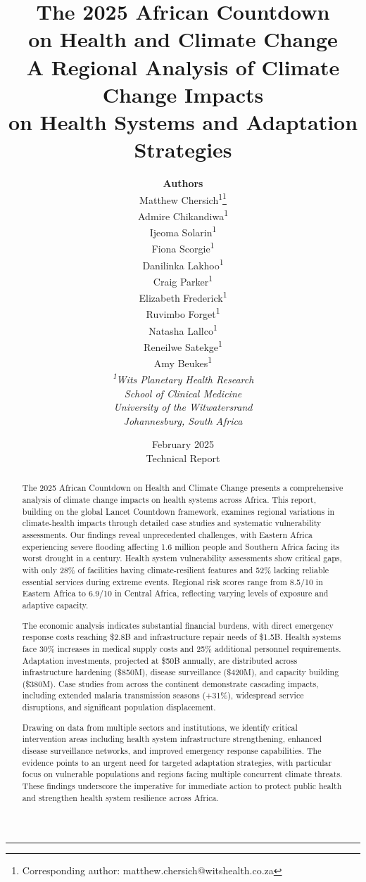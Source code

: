 \documentclass[12pt,a4paper]{article}
\title{The 2025 African Countdown\\[0.3em]
on Health and Climate Change\\[1cm]
{\color{subtitlegray}\Large A Regional Analysis of Climate Change Impacts\\
on Health Systems and Adaptation Strategies}}
\author{%
    \textbf{Authors}\\[0.5cm]
    Matthew Chersich\textsuperscript{1}\thanks{Corresponding author: matthew.chersich@witshealth.co.za}\\
    Admire Chikandiwa\textsuperscript{1} \\
    Ijeoma Solarin\textsuperscript{1} \\
    Fiona Scorgie\textsuperscript{1} \\
    Danilinka Lakhoo\textsuperscript{1} \\
    Craig Parker\textsuperscript{1} \\
    Elizabeth Frederick\textsuperscript{1} \\
    Ruvimbo Forget\textsuperscript{1} \\
    Natasha Lallco\textsuperscript{1} \\
    Reneilwe Satekge\textsuperscript{1} \\
    Amy Beukes\textsuperscript{1}%
    \\[1.5cm]
    {\small\itshape
    \textsuperscript{1}Wits Planetary Health Research\\
    School of Clinical Medicine\\
    University of the Witwatersrand\\
    Johannesburg, South Africa}%
}
\date{{\small February 2025}\\[0.5cm]
{\footnotesize Technical Report}}
\begin{document}
\thispagestyle{empty}
\maketitle

\vspace{-1cm}
\begin{center}
\rule{0.5\textwidth}{0.5pt}
\end{center}

\clearpage

\begin{abstract}
The 2025 African Countdown on Health and Climate Change presents a comprehensive analysis of climate change impacts on health systems across Africa. This report, building on the global Lancet Countdown framework, examines regional variations in climate-health impacts through detailed case studies and systematic vulnerability assessments. Our findings reveal unprecedented challenges, with Eastern Africa experiencing severe flooding affecting 1.6 million people and Southern Africa facing its worst drought in a century. Health system vulnerability assessments show critical gaps, with only 28\% of facilities having climate-resilient features and 52\% lacking reliable essential services during extreme events. Regional risk scores range from 8.5/10 in Eastern Africa to 6.9/10 in Central Africa, reflecting varying levels of exposure and adaptive capacity.

The economic analysis indicates substantial financial burdens, with direct emergency response costs reaching \$2.8B and infrastructure repair needs of \$1.5B. Health systems face 30\% increases in medical supply costs and 25\% additional personnel requirements. Adaptation investments, projected at \$50B annually, are distributed across infrastructure hardening (\$850M), disease surveillance (\$420M), and capacity building (\$380M). Case studies from across the continent demonstrate cascading impacts, including extended malaria transmission seasons (+31\%), widespread service disruptions, and significant population displacement.

Drawing on data from multiple sectors and institutions, we identify critical intervention areas including health system infrastructure strengthening, enhanced disease surveillance networks, and improved emergency response capabilities. The evidence points to an urgent need for targeted adaptation strategies, with particular focus on vulnerable populations and regions facing multiple concurrent climate threats. These findings underscore the imperative for immediate action to protect public health and strengthen health system resilience across Africa.
\end{abstract}
\end{document}
